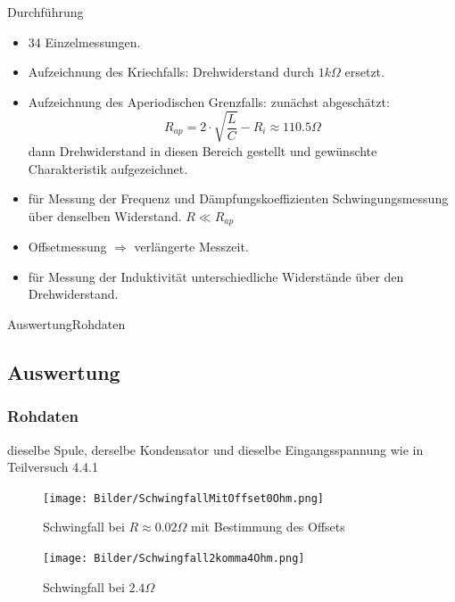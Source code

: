\documentclass[11pt]{beamer}
\begin{document}
\begin{frame}{Durchführung}
\begin{itemize}
\subsection{Durchführung}
\item 34 Einzelmessungen.
\item Aufzeichnung des Kriechfalls: Drehwiderstand durch $1k\Omega$ ersetzt.
\item Aufzeichnung des Aperiodischen Grenzfalls: zunächst abgeschätzt:
\begin{equation}
R_{ap}=2\cdot\sqrt{\frac{L}{C}}-R_i\approx 110.5\Omega
\end{equation}
dann Drehwiderstand in diesen Bereich gestellt und gewünschte Charakteristik aufgezeichnet. 
\item für Messung der Frequenz und Dämpfungskoeffizienten Schwingungsmessung über denselben Widerstand. $R\ll R_{ap}$
\item Offsetmessung $\Rightarrow$ verlängerte Messzeit.
\item für Messung der Induktivität unterschiedliche Widerstände über den Drehwiderstand.
\end{itemize}
\end{frame}

\begin{frame}{Auswertung}{Rohdaten}
\subsection{Auswertung}
\subsubsection{Rohdaten}
dieselbe Spule, derselbe Kondensator und dieselbe Eingangsspannung wie in Teilversuch 4.4.1
\begin{figure}[H]
\caption{Schwingfall bei $R\approx 0.02\Omega$ mit Bestimmung des Offsets}
\centering
\texttt{[image: Bilder/SchwingfallMitOffset0Ohm.png]}
\end{figure}
\end{frame}

\begin{frame}
\begin{figure}[H]
\caption{Schwingfall bei $2.4\Omega$}
\centering
\texttt{[image: Bilder/Schwingfall2komma4Ohm.png]}
\end{figure}
\end{frame}
\end{document}
